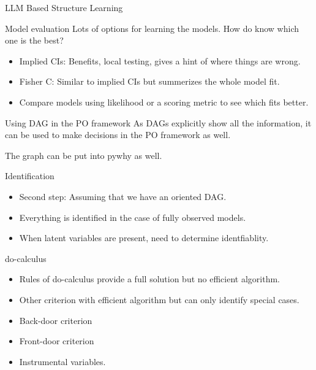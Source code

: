 \documentclass{beamer}
\begin{document}
\begin{frame}{LLM Based Structure Learning}
\end{frame}

\begin{frame}{Model evaluation}
	Lots of options for learning the models. How do know which one is the best?
	\begin{itemize}
		\item Implied CIs: Benefits, local testing, gives a hint of where things are wrong.
		\item Fisher C: Similar to implied CIs but summerizes the whole model fit.
		\item Compare models using likelihood or a scoring metric to see which fits better.
	\end{itemize}
\end{frame}

\begin{frame}{Using DAG in the PO framework}
	As DAGs explicitly show all the information, it can be used to make
	decisions in the PO framework as well.

	The graph can be put into pywhy as well.
\end{frame}

\begin{frame}{Identification}
	\begin{itemize}
		\item Second step: Assuming that we have an oriented DAG.
		\item Everything is identified in the case of fully observed models.

		\item When latent variables are present, need to determine identfiablity.
	\end{itemize}
\end{frame}

\begin{frame}{do-calculus}
	\begin{itemize}
		\item Rules of do-calculus provide a full solution but no
			efficient algorithm.
		\item Other criterion with efficient algorithm but can only
			identify special cases.
		\item Back-door criterion
		\item Front-door criterion
		\item Instrumental variables.
	\end{itemize}
\end{frame}
\end{document}
